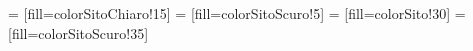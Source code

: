 	~
	
	~
	
	\newcommand{\NaturalElementTextFormat}[7]
	{
		\begin{minipage}{2.21cm}
			\centering
			{\textbf{#1}\hspace{1em} \underline{{#7}} \hfill {#2}\textit{{#3}}}%
			\\[0.1cm]
			{\Huge \textbf{{#5}}}
			\linebreak
			{\fontsize{9.5}{10.0}\selectfont {#6} }
			\linebreak
			{\small {#4}} 
		\end{minipage}
	}
	
	\newcommand{\KeyTextFormat}[7]
	{
		\begin{minipage}{2.21m}
			\centering
			{\textbf{#1}\hspace{1em} \underline{{#7}} \hfill {#2}\textit{{#3}}}%
			\\[0.1cm]
			{\Huge \textbf{{#5}}}
			\linebreak
			{\fontsize{9.5}{10}\selectfont {#6} }
			\linebreak
			{\small {#4}} 
		\end{minipage}
	}
	 = [fill=colorSitoChiaro!15] %
	 = [fill=colorSitoScuro!5] %
	 = [fill=colorSito!30] %
	 = [fill=colorSitoScuro!35] %
	
